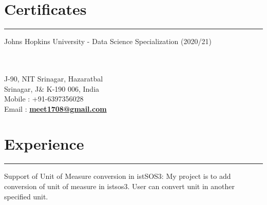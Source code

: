 \documentclass[]{meetresume-class}
\begin{document}
\begin{minipage}[t]{0.33\textwidth}
		\section{Certificates}
		\noindent\rule{5cm}{0.6pt}
		
		Johns Hopkins University - Data Science Specialization (2020/21)\\
		
	\end{minipage} 
	\hfill
	\begin{minipage}[t]{0.66\textwidth} 
		\hspace*{0pt}\hfill    \\
		\hspace*{0pt}\hfill    \\
		\hspace*{0pt}\hfill J-90, NIT Srinagar, Hazaratbal \\
		\hspace*{0pt}\hfill Srinagar, J$\&$ K-190 006, India \\
		\hspace*{0pt}\hfill Mobile : +91-6397356028 \\
		\hspace*{0pt}\hfill Email : \textbf{\href{mailto:meet1708@gmail.com}{meet1708@gmail.com}} \\
		\hspace*{0pt}\hfill %
		\section{Experience}
		\noindent\rule{12.5cm}{0.4pt}
		 
		\noindent
		\hspace{5em}%
		\begin{minipage}{0.85\textwidth\vspace{2pt}}
			Support of Unit of Measure conversion in istSOS3: My project is to add conversion of
			unit of measure in istsos3. User can convert unit in another specified unit.
		\end{minipage}
		\sectionsep
		

\end{minipage}
\end{document}
